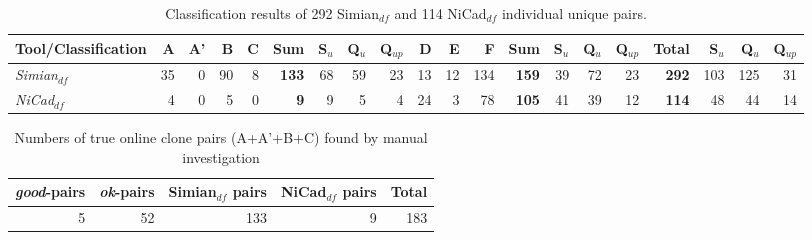 \documentclass{IEEEtran}
\begin{document}
\begin{table}[H]
	\centering
	\caption{Classification results of 292 Simian$_{df}$ and 114 NiCad$_{df}$ individual unique pairs.}
	\label{tab:classification_indv}
	\begin{tabular}{|l|r|r|r|r|r|r|r|r|r|r|r|r|r|r|r|r|r|r|r|}
		\hline 
		Tool/Classification & A & A' & B & C & \textbf{Sum} & S$_{u}$ & Q$_{u}$ & Q$_{up}$ & D & E & F & \textbf{Sum}  & S$_{u}$ & Q$_{u}$ & Q$_{up}$ & \textbf{Total} & S$_{u}$ & Q$_{u}$  & Q$_{up}$  \\ 
		\hline 
		\multirow{1}{*}{\textit{Simian$_{df}$}} & 35 & 0 & 90 & 8 & \textbf{133} & 68 & 59 & 23 & 13 & 12 & 134 & \textbf{159} & 39 & 72 & 23 & \textbf{292} & 103 & 125 & 31 \\
		\hline
		\multirow{1}{*}{\textit{NiCad$_{df}$}} & 4  & 0 & 5 & 0 & \textbf{9} & 9 & 5 & 4 & 24 & 3 & 78 & \textbf{105} & 41 & 39 & 12 & \textbf{114} & 48 & 44 & 14 \\ 
		\hline
	\end{tabular} 
\end{table}

\begin{table}[H]
	\centering
	\caption{Numbers of true online clone pairs (A+A'+B+C) found by manual investigation}
	\label{tab:classification_indv_summary}
	\begin{tabular}{r|r|r|r|r}
		\hline 
		\textit{good}-pairs & \textit{ok}-pairs & Simian$_{df}$ pairs & NiCad$_{df}$ pairs & Total \\ 
		\hline 
		5 & 52 & 133 & 9 & 183 \\
		\hline
	\end{tabular} 
\end{table}

\end{document}
